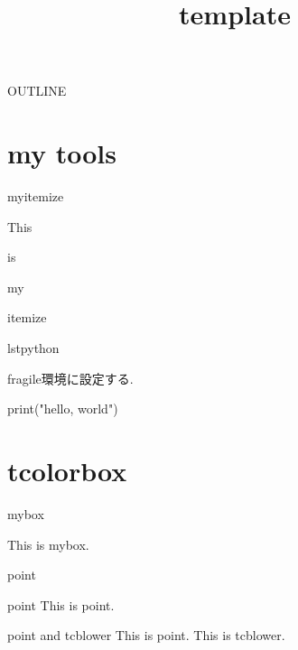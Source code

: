 \documentclass[aspectratio=169]{beamer}
\title{template}
\institute{}
\author{}
\date{\empty}
\begin{document}
    \maketitle

    \begin{frame}{OUTLINE}{}
        \tableofcontents
    \end{frame}

    \section{my tools}

    \begin{frame}{myitemize}
        \begin{myitemize}
            \item This 
            \item is
            \item my 
            \item itemize
        \end{myitemize}
    \end{frame}

    \begin{frame}[fragile]{lstpython}
        \begin{marker}
            fragile環境に設定する.
        \end{marker}
        \begin{lstpython}
print("hello, world")
        \end{lstpython}
    \end{frame}

    \section{tcolorbox}

    \begin{frame}{mybox}{}
        \begin{mybox}
            This is mybox.
        \end{mybox}
    \end{frame}

    \begin{frame}{point}{}
        \begin{point}{point}
            This is point.
        \end{point}

        \begin{point}{point and tcblower}
            This is point.
            \tcblower
            This is tcblower.
        \end{point}
    \end{frame}
\end{document}
